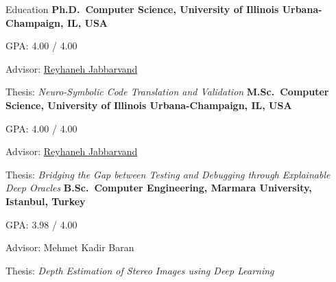 \begin{rubric}{Education}
\entry*[08/22 -- 08/26]%
	\textbf{Ph.D.~Computer Science, University of Illinois Urbana-Champaign, IL, USA}
        \par GPA: 4.00 / 4.00
        \par Advisor: \href{https://reyhaneh.cs.illinois.edu/}{Reyhaneh Jabbarvand}
	\par Thesis: \emph{Neuro-Symbolic Code Translation and Validation} 
%
\entry*[08/22 -- 12/24]%
	\textbf{M.Sc.~Computer Science, University of Illinois Urbana-Champaign, IL, USA}
        \par GPA: 4.00 / 4.00
        \par Advisor: \href{https://reyhaneh.cs.illinois.edu/}{Reyhaneh Jabbarvand}
	\par Thesis: \emph{Bridging the Gap between Testing and Debugging through Explainable Deep Oracles}
% 
\entry*[09/18 -- 07/22]%
	\textbf{B.Sc.~Computer Engineering, Marmara University, Istanbul, Turkey}
        \par GPA: 3.98 / 4.00
        \par Advisor: Mehmet Kadir Baran
        \par Thesis: \emph{Depth Estimation of Stereo Images using Deep Learning}
\end{rubric}